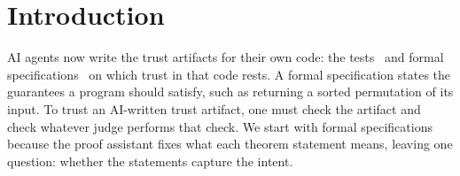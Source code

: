 \section{Introduction}
AI agents now write the trust artifacts for their own code: the tests~\citep{haque2026agentictests} and formal specifications~\citep{yang2024formalreasoning} on which trust in that code rests.
A formal specification states the guarantees a program should satisfy, such as returning a sorted permutation of its input.
To trust an AI-written trust artifact, one must check the artifact and check whatever judge performs that check.
We start with formal specifications because the proof assistant fixes what each theorem statement means, leaving one question: whether the statements capture the intent.

